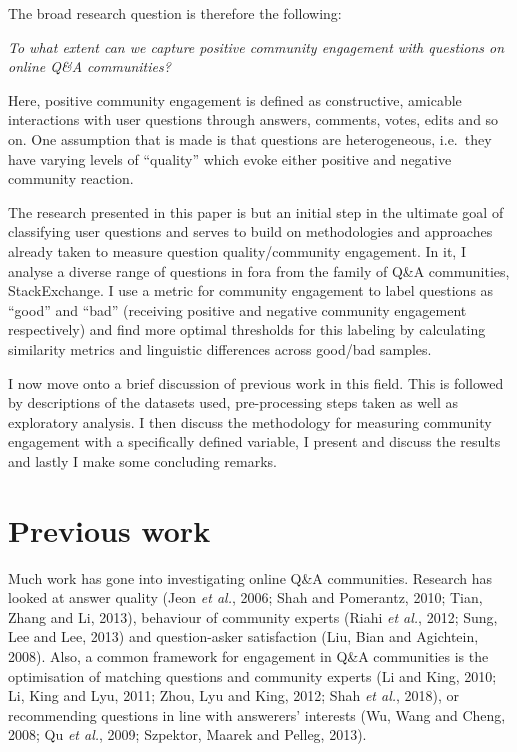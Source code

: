\documentclass[12pt,preprint, authoryear]{article}
\numberwithin{equation}{section}
\numberwithin{figure}{section}
\numberwithin{table}{section}
\begin{document}
The broad research question is therefore the following:

\begin{center}
\emph{To what extent can we capture positive community engagement with questions on online Q\&A communities?}
\end{center}

Here, positive community engagement is defined as constructive, amicable
interactions with user questions through answers, comments, votes, edits
and so on. One assumption that is made is that questions are
heterogeneous, i.e.~they have varying levels of ``quality'' which evoke
either positive and negative community reaction.

\newpage

The research presented in this paper is but an initial step in the
ultimate goal of classifying user questions and serves to build on
methodologies and approaches already taken to measure question
quality/community engagement. In it, I analyse a diverse range of
questions in fora from the family of Q\&A communities, StackExchange. I
use a metric for community engagement to label questions as ``good'' and
``bad'' (receiving positive and negative community engagement
respectively) and find more optimal thresholds for this labeling by
calculating similarity metrics and linguistic differences across
good/bad samples.

I now move onto a brief discussion of previous work in this field. This
is followed by descriptions of the datasets used, pre-processing steps
taken as well as exploratory analysis. I then discuss the methodology
for measuring community engagement with a specifically defined variable,
I present and discuss the results and lastly I make some concluding
remarks.

\section{Previous work}\label{previous-work}

Much work has gone into investigating online Q\&A communities. Research
has looked at answer quality (Jeon \emph{et al.}, 2006; Shah and
Pomerantz, 2010; Tian, Zhang and Li, 2013), behaviour of community
experts (Riahi \emph{et al.}, 2012; Sung, Lee and Lee, 2013) and
question-asker satisfaction (Liu, Bian and Agichtein, 2008). Also, a
common framework for engagement in Q\&A communities is the optimisation
of matching questions and community experts (Li and King, 2010; Li, King
and Lyu, 2011; Zhou, Lyu and King, 2012; Shah \emph{et al.}, 2018), or
recommending questions in line with answerers' interests (Wu, Wang and
Cheng, 2008; Qu \emph{et al.}, 2009; Szpektor, Maarek and Pelleg, 2013).
\end{document}

